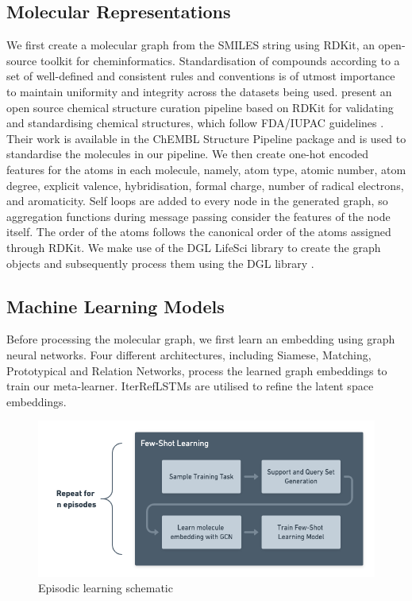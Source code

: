 \subsection{Molecular Representations}

We first create a molecular graph from the SMILES string using RDKit, an open-source toolkit for cheminformatics. Standardisation of compounds according to a set of well-defined and consistent rules and conventions is of utmost importance to maintain uniformity and integrity across the datasets being used. \citet{bento2020open} present an open source chemical structure curation pipeline based on RDKit for validating and standardising chemical structures, which follow FDA/IUPAC guidelines \citep{brecher2006graphical, food2007substance}. Their work is available in the ChEMBL Structure Pipeline package \cite{bento2020open} and is used to standardise the molecules in our pipeline. We then create one-hot encoded features for the atoms in each molecule, namely, atom type, atomic number, atom degree, explicit valence, hybridisation, formal charge, number of radical electrons, and aromaticity. Self loops are added to every node in the generated graph, so aggregation functions during message passing consider the features of the node itself. The order of the atoms follows the canonical order of the atoms assigned through RDKit. We make use of the DGL LifeSci \cite{dgllife} library to create the graph objects and subsequently process them using the DGL library \cite{wang2019dgl}.


\subsection{Machine Learning Models}

Before processing the molecular graph, we first learn an embedding using graph neural networks. Four different architectures, including Siamese, Matching, Prototypical and Relation Networks, process the learned graph embeddings to train our meta-learner. IterRefLSTMs are utilised to refine the latent space embeddings.
\begin{figure}[h]
	\centering
	\includegraphics[width=0.9\linewidth]{img/episodic-learning.png}
	\caption{Episodic learning schematic}
	\label{fig:episodiclearning}
\end{figure}

